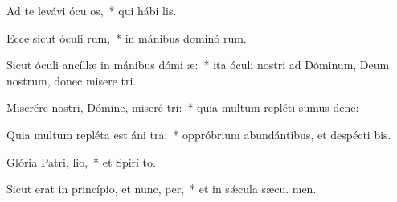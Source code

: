 \item Ad te levávi ócu os,~* qui hábi  lis.
\item Ecce sicut óculi rum,~* in mánibus dominó rum.
\item Sicut óculi ancíllæ in mánibus dómi æ:~* ita óculi nostri ad Dóminum, Deum nostrum, donec misere tri.
\item Miserére nostri, Dómine, miseré tri:~* quia multum repléti sumus dene:
\item Quia multum repléta est áni tra:~* oppróbrium abundántibus, et despécti bis.
\item Glória Patri,  lio,~* et Spirí to.
\item Sicut erat in princípio, et nunc,  per,~* et in sǽcula sæcu. men.
